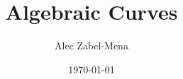 \documentclass[12pt, twoside]{book}
\title{Algebraic Curves}
\author{Alec Zabel-Mena}
\date{\today}
\begin{document}
\maketitle
\tableofcontents
\newpage




\nocite{*}



\end{document}

